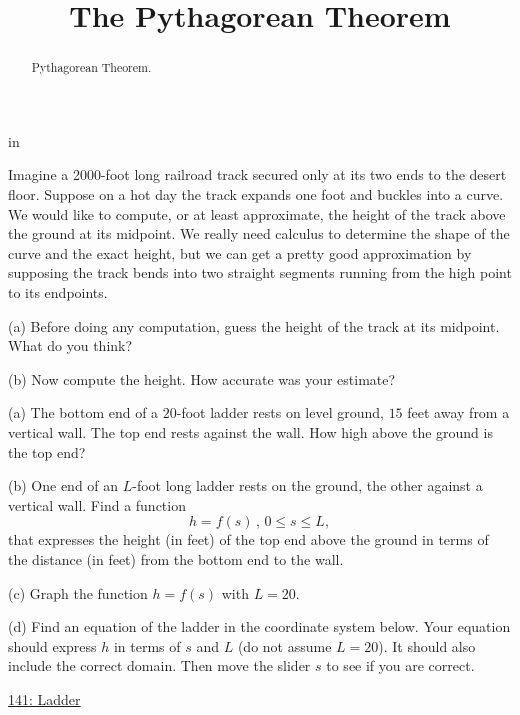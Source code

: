 \documentclass{ximera}
\title{The Pythagorean Theorem}
\newcommand{\pskip}{\vskip 0.1 in}
\begin{document}
\begin{abstract}
Pythagorean Theorem.
\end{abstract}
\maketitle


\pskip


\begin{question}  \label{Q324dfg45rhp}
Imagine a 2000-foot long railroad track secured only at its two ends to the desert floor. Suppose on a hot day the track expands one foot and buckles into a curve. We would like to compute, or at least approximate, the height of the track above the ground at its midpoint. We really need calculus to determine the shape of the curve and the exact height, but we can get a pretty good approximation by supposing the track bends into two straight segments running from the high point to its endpoints.


\begin{freeResponse}
(a) Before doing any computation, guess the height of the track at its midpoint. What do you think?
\end{freeResponse}

(b) Now compute the height. How accurate was your estimate?
\end{question}


\begin{question}  \label{Qdfdst4nb554334}
(a) The bottom end of a $20$-foot ladder rests on level ground, $15$ feet away from a vertical wall. The top end rests against the wall. How high above the ground is the top end?

(b) One end of an $L$-foot long ladder rests on the ground, the other against a vertical wall. Find a function 
\[
  h = f(s) \, , \, 0\leq s \leq L,
\]
that expresses the height (in feet) of the top end above the ground in terms of the distance (in feet) from the bottom end to the wall.

(c)  Graph the function $h = f(s)$ with $L=20$.

(d) Find an equation of the ladder in the coordinate system below. Your equation should express $h$ in terms of $s$ and $L$ (do not assume $L=20$). It should also include the correct domain. Then move the slider $s$ to see if you are correct.

\begin{exploration}

\begin{onlineOnly}
    \begin{center}
\end{center}
\end{onlineOnly}

\href{https://www.desmos.com/calculator/orpmncb1dx}{141: Ladder}

\end{exploration}
\end{question}
\end{document}

